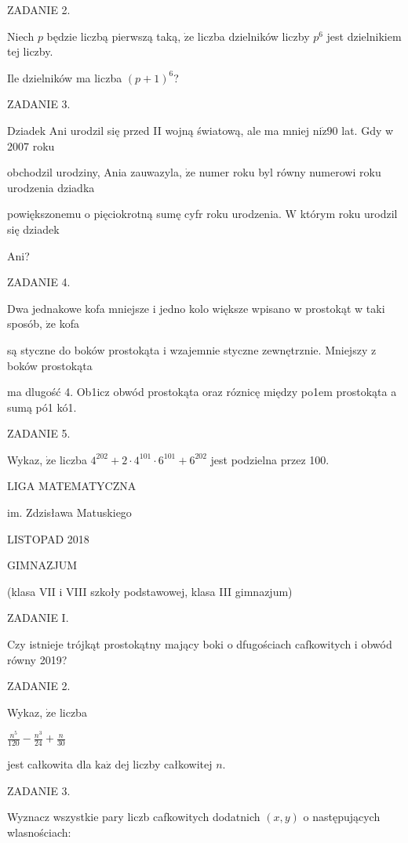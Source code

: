 \documentclass[a4paper,12pt]{article}
\begin{document}
ZADANIE 2.

Niech $p$ będzie liczbą pierwszą taką, $\dot{\mathrm{z}}\mathrm{e}$ liczba dzielników liczby $p^{6}$ jest dzielnikiem tej liczby.

Ile dzielników ma liczba $(p+1)^{6}$?

ZADANIE 3.

Dziadek Ani urodzil się przed II wojną światową, ale ma mniej $\mathrm{n}\mathrm{i}\dot{\mathrm{z}}90$ lat. Gdy w 2007 roku

obchodzil urodziny, Ania zauwazyla, $\dot{\mathrm{z}}\mathrm{e}$ numer roku byl równy numerowi roku urodzenia dziadka

powiększonemu o pięciokrotną sumę cyfr roku urodzenia. $\mathrm{W}$ którym roku urodzil się dziadek

Ani?

ZADANIE 4.

Dwa jednakowe kofa mniejsze i jedno kolo większe wpisano w prostokąt w taki sposób, $\dot{\mathrm{z}}\mathrm{e}$ kofa

są styczne do boków prostokąta i wzajemnie styczne zewnętrznie. Mniejszy z boków prostokąta

ma dlugość 4. Ob1icz obwód prostokąta oraz róznicę między po1em prostokąta a sumą pó1 kó1.

ZADANIE 5.

Wykaz, $\dot{\mathrm{z}}\mathrm{e}$ liczba $4^{202}+2\cdot 4^{101}\cdot 6^{101}+6^{202}$ jest podzielna przez 100.






LIGA MATEMATYCZNA

im. Zdzisława Matuskiego

LISTOPAD 2018

GIMNAZJUM

(klasa VII i VIII szkoły podstawowej, klasa III gimnazjum)

ZADANIE I.

Czy istnieje trójkąt prostokątny mający boki o dfugościach cafkowitych i obwód równy 2019?

ZADANIE 2.

Wykaz, $\dot{\mathrm{z}}\mathrm{e}$ liczba

$\displaystyle \frac{n^{5}}{120}-\frac{n^{3}}{24}+\frac{n}{30}$

jest całkowita dla $\mathrm{k}\mathrm{a}\dot{\mathrm{z}}$ dej liczby całkowitej $n.$

ZADANIE 3.

Wyznacz wszystkie pary liczb cafkowitych dodatnich $(x,y)$ o następujących wlasnościach:
\end{document}
